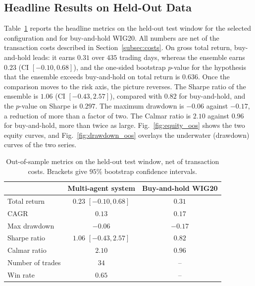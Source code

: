 \documentclass{ieeeaccess}
\newcommand{\TRtest}{\ensuremath{0.23}}
\newcommand{\TRtestCIlow}{\ensuremath{-0.10}}
\newcommand{\TRtestCIhigh}{\ensuremath{0.68}}
\newcommand{\Shtest}{\ensuremath{1.06}}
\newcommand{\ShtestCIlow}{\ensuremath{-0.43}}
\newcommand{\ShtestCIhigh}{\ensuremath{2.57}}
\newcommand{\MDDtest}{\ensuremath{-0.06}}
\newcommand{\Calmtest}{\ensuremath{2.10}}
\newcommand{\CAGRtest}{\ensuremath{0.13}}
\newcommand{\Ntrades}{\ensuremath{34}}
\newcommand{\WinRate}{\ensuremath{0.65}}
\newcommand{\BHtest}{\ensuremath{0.31}}
\newcommand{\BHsharpe}{\ensuremath{0.82}}
\newcommand{\MDDbh}{\ensuremath{-0.17}}
\newcommand{\CAGRbh}{\ensuremath{0.17}}
\newcommand{\Calmbh}{\ensuremath{0.96}}
\newcommand{\PvsBH}{\ensuremath{0.636}}
\newcommand{\PvsBHsharpe}{\ensuremath{0.297}}
\newcommand{\OOSDays}{\ensuremath{435}}
\begin{document}
\subsection{Headline Results on Held-Out Data}
\label{subsec:headline}

Table~\ref{tab:headline} reports the headline metrics on the held-out test window for the selected configuration and for buy-and-hold WIG20. All numbers are net of the transaction costs described in Section~\ref{subsec:costs}. On gross total return, buy-and-hold leads: it earns \BHtest{} over \OOSDays{} trading days, whereas the ensemble earns \TRtest{} (CI $[\TRtestCIlow, \TRtestCIhigh]$), and the one-sided bootstrap $p$-value for the hypothesis that the ensemble exceeds buy-and-hold on total return is \PvsBH{}. Once the comparison moves to the risk axis, the picture reverses. The Sharpe ratio of the ensemble is \Shtest{} (CI $[\ShtestCIlow, \ShtestCIhigh]$), compared with \BHsharpe{} for buy-and-hold, and the $p$-value on Sharpe is \PvsBHsharpe{}. The maximum drawdown is \MDDtest{} against \MDDbh{}, a reduction of more than a factor of two. The Calmar ratio is \Calmtest{} against \Calmbh{} for buy-and-hold, more than twice as large. Fig.~\ref{fig:equity_oos} shows the two equity curves, and Fig.~\ref{fig:drawdown_oos} overlays the underwater (drawdown) curves of the two series.

\begin{table}[t]
\centering
\caption{Out-of-sample metrics on the held-out test window, net of transaction costs. Brackets give $95\%$ bootstrap confidence intervals.}
\label{tab:headline}
\begin{tabular}{lcc}
\toprule
 & Multi-agent system & Buy-and-hold WIG20 \\
\midrule
Total return     & $\TRtest$ $[\TRtestCIlow, \TRtestCIhigh]$ & $\BHtest$ \\
CAGR             & $\CAGRtest$ & $\CAGRbh$ \\
Max drawdown     & $\MDDtest$  & $\MDDbh$ \\
Sharpe ratio     & $\Shtest$ $[\ShtestCIlow, \ShtestCIhigh]$ & $\BHsharpe$ \\
Calmar ratio     & $\Calmtest$ & $\Calmbh$ \\
Number of trades & $\Ntrades$  & -- \\
Win rate         & $\WinRate$  & -- \\
\bottomrule
\end{tabular}
\end{table}
\end{document}
